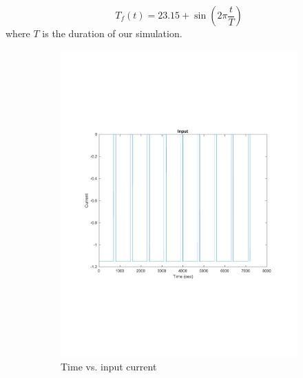 \documentclass[10pt]{article}
\begin{document}
\begin{equation}
	T_f(t) = 23.15+\sin( 2\pi\frac{t}{T})
\end{equation}
where $T$ is the duration of our simulation. 
\begin{figure}[H]
	\centering
	\begin{subfigure}[t]{0.4\textwidth}
		\includegraphics[width=\textwidth]{current.pdf}
		\caption{Time vs. input current}
		\label{fig:inputCurrent}
	\end{subfigure}
	\begin{subfigure}[t]{0.4\textwidth}

\end{subfigure}
\end{figure}
\end{document}
